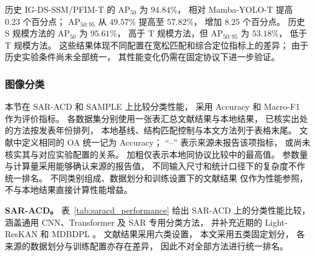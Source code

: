 历史 IG-DS-SSM/PFIM-T 的 AP$_{50}$ 为 $94.84\%$，
相对 Mamba-YOLO-T 提高 $0.23$ 个百分点；
AP$_{50:95}$ 从 $49.57\%$ 提高至 $57.82\%$，
增加 $8.25$ 个百分点。
历史 S 规模方法的 AP$_{50}$ 为 $95.61\%$，
高于 T 规模方法，但 AP$_{50:95}$ 为 $53.18\%$，
低于 T 规模方法。
这些结果体现不同配置在宽松匹配和综合定位指标上的差异；
由于历史实验条件尚未全部统一，
其性能变化仍需在固定协议下进一步验证。

\FloatBarrier
\subsubsection{图像分类}
\label{sec:classification_results}

本节在 SAR-ACD 和 SAMPLE 上比较分类性能，
采用 Accuracy 和 Macro-F1 作为评价指标。
各数据集分别使用一张表汇总文献结果与本地结果，
已核实出处的方法按发表年份排列，
本地基线、结构匹配控制与本文方法列于表格末尾。
文献中定义相同的 OA 统一记为 Accuracy；
``--'' 表示来源未报告该项指标，
或尚未核实其与对应实验配置的关系。
加粗仅表示本地同协议比较中的最高值。
参数量与计算量采用能够确认来源的报告值，
不同输入尺寸和统计口径下的复杂度不作统一排名。
不同类别组成、数据划分和训练设置下的文献结果
仅作为性能参照，不与本地结果直接计算性能增益。

\textbf{SAR-ACD。}
表~\ref{tab:saracd_performance}
给出 SAR-ACD 上的分类性能比较，
涵盖通用 CNN、Transformer
及 SAR 专用分类方法，
并补充近期的 Light-ResKAN 和 MDBDPL
\cite{summit2025,busip2025,lightreskan2026,mdbdpl2027}。
文献结果采用六类设置，
本文采用五类固定划分，
各来源的数据划分与训练配置亦存在差异，
因此不对全部方法进行统一排名。

